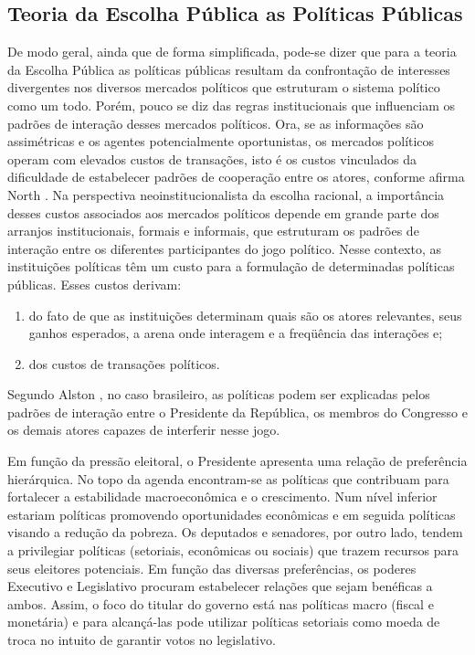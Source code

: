 
\subsection{Teoria da Escolha Pública as Políticas Públicas}

De modo geral, ainda que de forma simplificada, pode-se dizer que para a teoria da Escolha Pública as políticas públicas resultam da confrontação de interesses divergentes nos diversos mercados políticos que estruturam o sistema político como um todo. Porém, pouco se diz das regras institucionais que influenciam os padrões de interação desses mercados políticos. Ora, se as informações são assimétricas e os agentes potencialmente oportunistas, os mercados políticos operam com elevados custos de transações, isto é os custos vinculados da dificuldade de estabelecer padrões de cooperação entre os atores, conforme afirma  North \cite{North1990APolitics}. Na perspectiva neoinstitucionalista da escolha racional, a importância desses custos associados aos mercados políticos depende em grande parte dos arranjos institucionais, formais e informais, que estruturam os padrões de interação entre os diferentes participantes do jogo político. Nesse contexto, as instituições políticas têm um custo para a formulação de determinadas políticas públicas. Esses custos derivam: 

\begin{enumerate}%
	\item do fato de que as instituições determinam quais são os atores relevantes, seus ganhos esperados, a arena onde interagem e a freqüência das interações e;
	\item dos custos de transações políticos.
\end{enumerate}%


Segundo Alston \cite{Alston2006PoliticalBrazil}, no caso brasileiro, as políticas podem ser explicadas pelos padrões de interação entre o Presidente da República, os membros do Congresso e os demais atores capazes de interferir nesse jogo. 

Em função da pressão eleitoral, o Presidente apresenta uma relação de preferência hierárquica. No topo da agenda encontram-se as políticas que contribuam para fortalecer a estabilidade macroeconômica e o crescimento. Num nível inferior estariam políticas promovendo oportunidades econômicas e em seguida políticas visando a redução da pobreza. Os deputados e senadores, por outro lado, tendem a privilegiar políticas (setoriais, econômicas ou sociais) que trazem recursos para seus eleitores potenciais. Em função das diversas preferências, os poderes Executivo e Legislativo procuram estabelecer relações que sejam benéficas a ambos. Assim, o foco do titular do governo está nas políticas macro (fiscal e monetária) e para alcançá-las pode utilizar políticas setoriais como moeda de troca no intuito de garantir votos no legislativo. 

